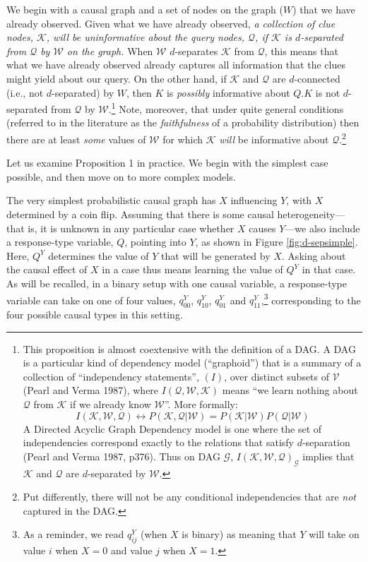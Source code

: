 \documentclass[
  12pt,
]{book}
\begin{document}
We begin with a causal graph and a set of nodes on the graph (\(W\)) that we have already observed. Given what we have already observed, \emph{a collection of clue nodes, \(\mathcal K\), will be uninformative about the query nodes, \(\mathcal Q\), if \(\mathcal K\) is \(d\)-separated from \(\mathcal Q\) by \(\mathcal W\) on the graph.} When \(\mathcal W\) \(d\)-separates \(\mathcal K\) from \(\mathcal Q\), this means that what we have already observed already captures all information that the clues might yield about our query. On the other hand, if \(\mathcal K\) and \(\mathcal Q\) are \(d\)-connected (i.e., not \(d\)-separated) by \(W\), then \(K\) is \emph{possibly} informative about \(Q\).\(K\) is not \(d\)-separated from \(\mathcal Q\) by \(\mathcal W\).\footnote{This proposition is almost coextensive with the definition of a DAG. A DAG is a particular kind of dependency model (``graphoid'') that is a summary of a collection of ``independency statements'', \((I)\), over distinct subsets of \(\mathcal V\) (Pearl and Verma 1987), where \(I(\mathcal Q,\mathcal W,\mathcal K)\) means ``we learn nothing about \(\mathcal Q\) from \(\mathcal K\) if we already know \(\mathcal W\)''. More formally:
  \[I(\mathcal K, \mathcal W,\mathcal Q) \leftrightarrow P(\mathcal K,\mathcal Q|\mathcal W)=P(\mathcal K|\mathcal W)P(\mathcal Q|\mathcal W)\]
  A Directed Acyclic Graph Dependency model is one where the set of independencies correspond exactly to the relations that satisfy \(d\)-separation (Pearl and Verma 1987, p376). Thus on DAG \(\mathcal G\), \(I(\mathcal K,\mathcal W,\mathcal Q)_\mathcal G\) implies that \(\mathcal K\) and \(\mathcal Q\) are \(d\)-separated by \(\mathcal W\).} Note, moreover, that under quite general conditions (referred to in the literature as the \emph{faithfulness} of a probability distribution) then there are at least \emph{some} values of \(\mathcal W\) for which \(\mathcal K\) \emph{will} be informative about \(\mathcal Q\).\footnote{Put differently, there will not be any conditional independencies that are \emph{not} captured in the DAG.}

Let us examine Proposition 1 in practice. We begin with the simplest case possible, and then move on to more complex models.

The very simplest probabilistic causal graph has \(X\) influencing \(Y\), with \(X\) determined by a coin flip. Assuming that there is some causal heterogeneity---that is, it is unknown in any particular case whether \(X\) causes \(Y\)---we also include a response-type variable, \(Q\), pointing into \(Y\), as shown in Figure \ref{fig:d-sepsimple}. Here, \(Q^Y\) determines the value of \(Y\) that will be generated by \(X\). Asking about the causal effect of \(X\) in a case thus means learning the value of \(Q^Y\) in that case. As will be recalled, in a binary setup with one causal variable, a response-type variable can take on one of four values, \(q^Y_{00}\), \(q^Y_{10}\), \(q^Y_{01}\) and \(q^Y_{11}\),\footnote{As a reminder, we read \(q^Y_{ij}\) (when \(X\) is binary) as meaning that \(Y\) will take on value \(i\) when \(X=0\) and value \(j\) when \(X=1\).} corresponding to the four possible causal types in this setting.
\end{document}
